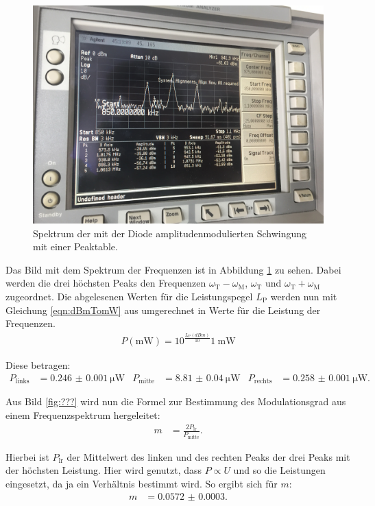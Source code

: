 \begin{figure}[h]
  \centering
  \includegraphics[width=.9\textwidth]{Spektrum_Pics/c.jpg}
  \caption{Spektrum der mit der Diode amplitudenmodulierten Schwingung mit einer Peaktable.}
  \label{fig:c}
\end{figure}

Das Bild mit dem Spektrum der Frequenzen ist in Abbildung \ref{fig:c} zu sehen.
Dabei werden die drei höchsten Peaks den Frequenzen $\omega_\text{T} - \omega_\text{M}$, $\omega_\text{T}$ und $\omega_\text{T} + \omega_\text{M}$ zugeordnet.
Die abgelesenen Werten für die Leistungspegel $L_\text{P}$ werden nun mit Gleichung \eqref{eqn:dBmTomW} aus \cite{leistungspegel} umgerechnet in Werte für die Leistung der Frequenzen.
\begin{align}
  P(\si{\milli\watt}) =
   10^{\frac{L_\text{P}(\si{dBm})}{10}} \SI{1}{\milli\watt} \label{eqn:dBmTomW}
\end{align}

Diese betragen:
\begin{align*}
  P_\text{links} &= \SI{0.246(1)}{\micro\watt} & P_\text{mitte} &= \SI{8.81(4)}{\micro\watt} & P_\text{rechts} &= \SI{0.258(1)}{\micro\watt}.
\end{align*}

Aus Bild \ref{fig:???} wird nun die Formel zur Bestimmung des Modulationsgrad aus einem Frequenzspektrum hergeleitet:
\begin{align*}
  m &= \frac{2 P_\text{lr}}{P_\text{mitte}}.
\end{align*}

Hierbei ist $P_\text{lr}$ der Mittelwert des linken und des rechten Peaks der drei Peaks mit der höchsten Leistung. Hier wird genutzt, dass $P \propto U$ und so die Leistungen eingesetzt, da ja ein Verhältnis bestimmt wird.
So ergibt sich für $m$:
\begin{align*}
  m &= \num{0.0572(3)}.
\end{align*}

